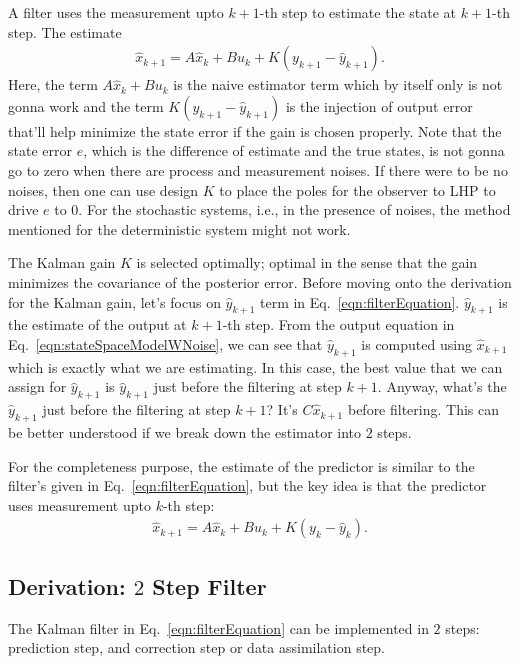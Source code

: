 A filter uses the measurement upto $k+1$-th step to estimate the state at $k+1$-th step. The estimate
\begin{align}
    \hat{x}_{k+1} = A \hat{x}_k + B u_k + K({y}_{k+1} - \hat{y}_{k+1}).
    \label{eqn:filterEquation}
\end{align}
Here, the term $A \hat{x}_k + B u_k$ is the naive estimator term which by itself only is not gonna work and the term $K({y}_{k+1} - \hat{y}_{k+1})$ is the injection of output error that'll help minimize the state error if the gain is chosen properly. Note that the state error $e$, which is the difference of estimate and the true states, is not gonna go to zero when there are process and measurement noises. If there were to be no noises, then one can use design $K$ to place the poles for the observer to LHP to drive $e$ to $0$. For the stochastic systems, i.e., in the presence of noises, the method mentioned for the deterministic system might not work.

The Kalman gain $K$ is selected optimally; optimal in the sense that the gain minimizes the covariance of the posterior error. Before moving onto the derivation for the Kalman gain, let's focus on $\hat{y}_{k+1}$ term in Eq.~\ref{eqn:filterEquation}. $\hat{y}_{k+1}$ is the estimate of the output at $k+1$-th step. From the output equation in Eq.~\ref{eqn:stateSpaceModelWNoise}, we can see that $\hat{y}_{k+1}$ is computed using $\hat{x}_{k+1}$ which is exactly what we are estimating. In this case, the best value that we can assign for $\hat{y}_{k+1}$ is $\hat{y}_{k+1}$ just before the filtering at step $k+1$. Anyway, what's the $\hat{y}_{k+1}$ just before the filtering at step $k+1$? It's $C \hat{x}_{k+1}$ before filtering. This can be better understood if we break down the estimator into $2$ steps.

For the completeness purpose, the estimate of the predictor is similar to the filter's given in Eq.~\ref{eqn:filterEquation}, but the key idea is that the predictor uses measurement upto $k$-th step:
\begin{align}
    \hat{x}_{k+1} = A \hat{x}_k + B u_k + K({y}_{k} - \hat{y}_{k}).
    \label{eqn:predictorEquation}
\end{align}

\subsection{Derivation: $2$ Step Filter}
\hspace{\parindent}The Kalman filter in Eq.~\ref{eqn:filterEquation} can be implemented in $2$ steps: prediction step, and correction step or data assimilation step.

